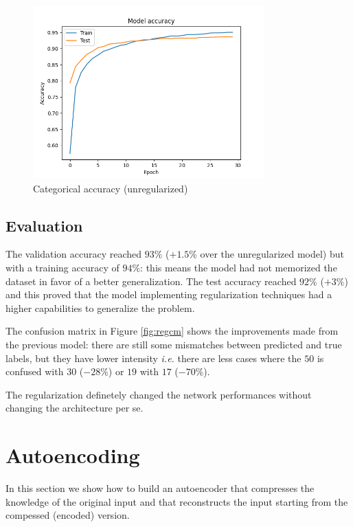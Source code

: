 \documentclass[compsoc]{IEEEtran}
\begin{document}
\begin{figure}[ht!]
\centering                                                                        
\includegraphics[width=3.5in]{../images/reg/accuracy-LeakyReLU-NoneType-categorical_crossentropy-Adam-50-256-0.1.png}
\captionsetup{justification=centering}                                                                                                                            
\caption{Categorical accuracy (unregularized)}
\label{fig:acc2}                                                                                                                                          
\end{figure} 


\subsection{Evaluation}

The validation accuracy reached $93\%$ ($+1.5\%$ over the unregularized model) but with a training accuracy of $94\%$: this means the model had not memorized the dataset
in favor of a better generalization. The test accuracy reached $92\%$ ($+3\%$) and this proved that the model implementing regularization techniques 
had a higher capabilities to generalize the problem. \par
The confusion matrix in Figure \ref{fig:regcm} shows the improvements made from the previous model: there are still some mismatches between predicted and true labels, but they have lower intensity \emph{i.e.} there are less cases where the $50$ is confused with $30$ ($-28\%$) or $19$ with $17$ ($-70\%$).\par
The regularization definetely changed the network performances without changing the architecture per se.

\section{Autoencoding}
In this section we show how to build an autoencoder that compresses the knowledge of the original input and that reconstructs the input starting from the compessed (encoded) version.
\end{document}
